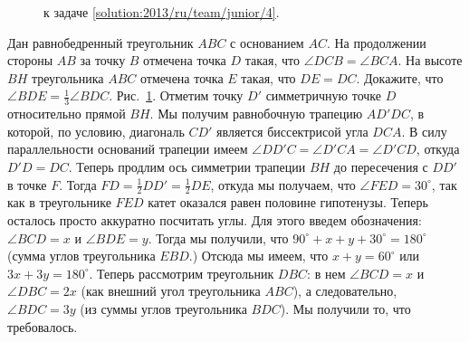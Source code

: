 \ifsolution
\begin{figure}\centering
    \caption{к задаче \ref{solution:2013/ru/team/junior/4}.}
    \label{fig:solution:2013/ru/team/junior/4}
\end{figure}
\fi %

\problem{}
Дан равнобедренный треугольник $ABC$ с основанием $AC$.
На продолжении стороны $AB$ за точку $B$ отмечена точка $D$ такая, что
$\angle DCB = \angle BCA$.
На высоте $BH$ треугольника $ABC$ отмечена точка $E$ такая, что $DE = DC$.
Докажите, что $\angle BDE = \frac{1}{3} \angle BDC$. 
\solution
\label{solution:2013/ru/team/junior/4}
Рис.~\ref{fig:solution:2013/ru/team/junior/4}.
Отметим точку $D'$ симметричную точке $D$ относительно прямой $BH$.
Мы получим равнобочную трапецию $AD'DC$, в которой, по условию, диагональ $CD'$
является биссектрисой угла $DCA$.
В силу параллельности оснований трапеции имеем
$\angle D D' C = \angle D' C A = \angle D' C D$, откуда $D'D = DC$.
Теперь продлим ось симметрии трапеции $BH$ до пересечения с $DD'$ в точке $F$.
Тогда $FD = \frac{1}{2} DD' = \frac{1}{2} DE$, откуда мы получаем, что
$\angle FED = 30^\circ$, так как в треугольнике $FED$ катет оказался равен
половине гипотенузы.
Теперь осталось просто аккуратно посчитать углы.
Для этого введем обозначения: $\angle BCD = x$ и $\angle BDE = y$.
Тогда мы получили, что $90^\circ + x + y + 30^\circ = 180^\circ$
(сумма углов треугольника $EBD$.)
Отсюда мы имеем, что $x + y = 60^\circ$ или $3 x + 3 y = 180^\circ$.
Теперь рассмотрим треугольник $DBC$: в нем $\angle BCD = x$ и
$\angle DBC = 2 x$ (как внешний угол треугольника $ABC$), а следовательно,
$\angle BDC = 3 y$ (из суммы углов треугольника $BDC$).
Мы получили то, что требовалось.
\endproblem
